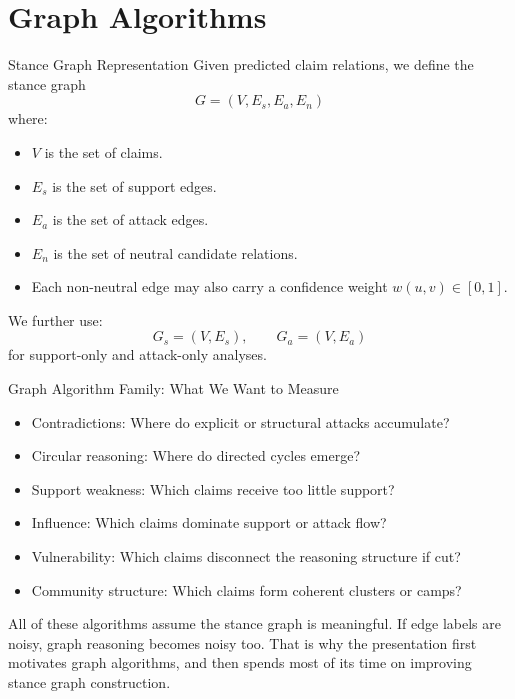 \documentclass[aspectratio=169, 10pt]{beamer}
\newcommand{\researchbox}[2]{%
  \begin{tcolorbox}[colback=accentorange!10, colframe=accentorange,
    title={\textbf{Research Lens:} #1}, fonttitle=\bfseries\small,
    left=4pt, right=4pt, top=3pt, bottom=3pt, boxrule=1pt]
    \small #2
  \end{tcolorbox}}
\begin{document}
\section{Graph Algorithms}

\begin{frame}{Stance Graph Representation}
Given predicted claim relations, we define the stance graph
\[
G = (V, E_s, E_a, E_n)
\]
where:
\begin{itemize}
  \item \(V\) is the set of claims.
  \item \(E_s\) is the set of support edges.
  \item \(E_a\) is the set of attack edges.
  \item \(E_n\) is the set of neutral candidate relations.
  \item Each non-neutral edge may also carry a confidence weight \(w(u,v)\in[0,1]\).
\end{itemize}

We further use:
\[
G_s = (V,E_s), \qquad G_a = (V,E_a)
\]
for support-only and attack-only analyses.
\end{frame}

\begin{frame}{Graph Algorithm Family: What We Want to Measure}
\begin{itemize}
  \item Contradictions: Where do explicit or structural attacks accumulate?
  \item Circular reasoning: Where do directed cycles emerge?
  \item Support weakness: Which claims receive too little support?
  \item Influence: Which claims dominate support or attack flow?
  \item Vulnerability: Which claims disconnect the reasoning structure if cut?
  \item Community structure: Which claims form coherent clusters or camps?
\end{itemize}

\researchbox{Important Dependency}{
All of these algorithms assume the stance graph is meaningful. If edge labels are noisy, graph reasoning becomes noisy too. That is why the presentation first motivates graph algorithms, and then spends most of its time on improving stance graph construction.
}
\end{frame}
\end{document}
